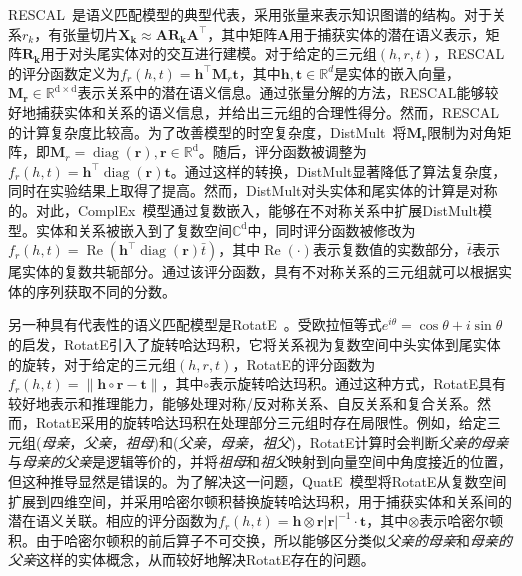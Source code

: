 \documentclass[algorithmlist, AutoFakeBold, AutoFakeSlant, figurelist, tablelist, nomlist, masters]{seuthesix}
\begin{document}
RESCAL~\cite{nickel2011three}是语义匹配模型的典型代表，采用张量来表示知识图谱的结构。对于关系$r_k$，有张量切片$\mathbf{X_k} \approx \mathbf{A R_k A^{\top}}$，其中矩阵$\mathbf{A}$用于捕获实体的潜在语义表示，矩阵$\mathbf{R_k}$用于对头尾实体对的交互进行建模。对于给定的三元组$\left(h, r, t\right)$，RESCAL的评分函数定义为$f_r(h, t)=\bm{h}^{\top} \mathbf{M}_r \bm{t}$，其中$\bm{h}, \bm{t} \in \mathbb{R}^d$是实体的嵌入向量，$\bm{M}_{\bm{r}} \in \mathbb{R}^\mathrm{d \times d}$表示关系中的潜在语义信息。通过张量分解的方法，RESCAL能够较好地捕获实体和关系的语义信息，并给出三元组的合理性得分。然而，RESCAL的计算复杂度比较高。为了改善模型的时空复杂度，DistMult~\cite{yang2015embedding}将$\mathbf{M_r}$限制为对角矩阵，即$\mathbf{M}_r=\operatorname{diag}(\bm{r}), \bm{r} \in \mathbb{R}^\mathrm{d}$。随后，评分函数被调整为$f_r(h, t)=\bm{h}^{\top} \operatorname{diag}(\bm{r}) \bm{t}$。通过这样的转换，DistMult显著降低了算法复杂度，同时在实验结果上取得了提高。然而，DistMult对头实体和尾实体的计算是对称的。对此，ComplEx~\cite{trouillon2016complex}模型通过复数嵌入，能够在不对称关系中扩展DistMult模型。实体和关系被嵌入到了复数空间$\mathbb{C}^\mathrm{d}$中，同时评分函数被修改为$f_r(h, t)=\operatorname{Re}\left(\bm{h}^{\top} \operatorname{diag}(\bm{r}) \bar{t}\right)$，其中$\operatorname{Re}(\cdot)$表示复数值的实数部分，$\bar{t}$表示尾实体的复数共轭部分。通过该评分函数，具有不对称关系的三元组就可以根据实体的序列获取不同的分数。

另一种具有代表性的语义匹配模型是RotatE~\cite{sun2018rotate}。受欧拉恒等式$e^{i \theta}=\cos \theta + i \sin \theta$的启发，RotatE引入了旋转哈达玛积，它将关系视为复数空间中头实体到尾实体的旋转，对于给定的三元组$\left(h, r, t\right)$，RotatE的评分函数为$f_r(h, t) = \|\bm{h} \circ \bm{r} - \bm{t}\|$，其中$\circ$表示旋转哈达玛积。通过这种方式，RotatE具有较好地表示和推理能力，能够处理对称/反对称关系、自反关系和复合关系。然而，RotatE采用的旋转哈达玛积在处理部分三元组时存在局限性。例如，给定三元组(\textit{母亲}，\textit{父亲}，\textit{祖母})和(\textit{父亲}，\textit{母亲}，\textit{祖父})，RotatE计算时会判断\textit{父亲的母亲}与\textit{母亲的父亲}是逻辑等价的，并将\textit{祖母}和\textit{祖父}映射到向量空间中角度接近的位置，但这种推导显然是错误的。为了解决这一问题，QuatE~\cite{zhang2019quaternion}模型将RotatE从复数空间扩展到四维空间，并采用哈密尔顿积替换旋转哈达玛积，用于捕获实体和关系间的潜在语义关联。相应的评分函数为$f_r(h, t)=\bm{h} \otimes \bm{r}|\bm{r}|^{-1} \cdot \bm{t}$，其中$\otimes$表示哈密尔顿积。由于哈密尔顿积的前后算子不可交换，所以能够区分类似\textit{父亲的母亲}和\textit{母亲的父亲}这样的实体概念，从而较好地解决RotatE存在的问题。
\end{document}

